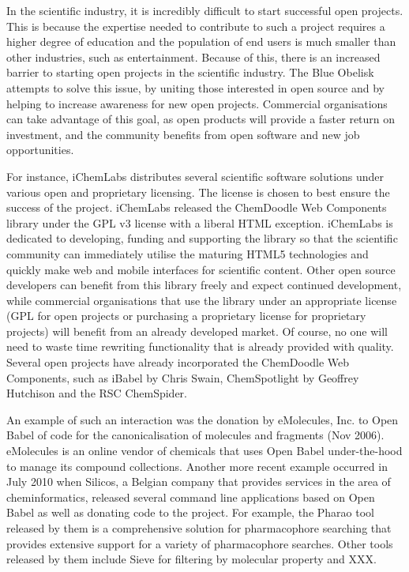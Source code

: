 \documentclass[10pt]{bmc_article}
\newenvironment{bmcformat}{\begin{raggedright}\baselineskip20pt\sloppy\setboolean{publ}{false}}{\end{raggedright}\baselineskip20pt\sloppy}
\begin{document}
\begin{bmcformat}
In the scientific industry, it is incredibly difficult to start successful open projects. This is because the expertise needed to contribute to such a project requires a higher degree of education and the population of end users is much smaller than other industries, such as entertainment. Because of this, there is an increased barrier to starting open projects in the scientific industry. The Blue Obelisk attempts to solve this issue, by uniting those interested in open source and by helping to increase awareness for new open projects. Commercial organisations can take advantage of this goal, as open products will provide a faster return on investment, and the community benefits from open software and new job opportunities.

For instance, iChemLabs distributes several scientific software solutions under various open and proprietary licensing. The license is chosen to best ensure the success of the project. iChemLabs released the ChemDoodle Web Components library under the GPL v3 license with a liberal HTML exception. iChemLabs is dedicated to developing, funding and supporting the library so that the scientific community can immediately utilise the maturing HTML5 technologies and quickly make web and mobile interfaces for scientific content. Other open source developers can benefit from this library freely and expect continued development, while commercial organisations that use the library under an appropriate license (GPL for open projects or purchasing a proprietary license for proprietary projects) will benefit from an already developed market. Of course, no one will need to waste time rewriting functionality that is already provided with quality. Several open projects have already incorporated the ChemDoodle Web Components, such as iBabel by Chris Swain\cite{iBabel}, ChemSpotlight by Geoffrey Hutchison\cite{chemspotlight} and the RSC ChemSpider\cite{chemspider_chemdoodle}.

An example of such an interaction was the donation by eMolecules, Inc.
to Open Babel of code for the canonicalisation of molecules and
fragments (Nov 2006). eMolecules is an online vendor of chemicals that
uses Open Babel under-the-hood to manage its compound collections.
Another more recent example occurred in July 2010 when Silicos, a
Belgian company that provides services
in the area of cheminformatics, released several command line
applications based on Open Babel as well as donating code to the
project. For example, the Pharao
tool released by them is a comprehensive solution for pharmacophore
searching that provides extensive support for a variety of
pharmacophore searches. Other tools released by them include Sieve for
filtering by molecular property and XXX.


\end{bmcformat}
\end{document}
